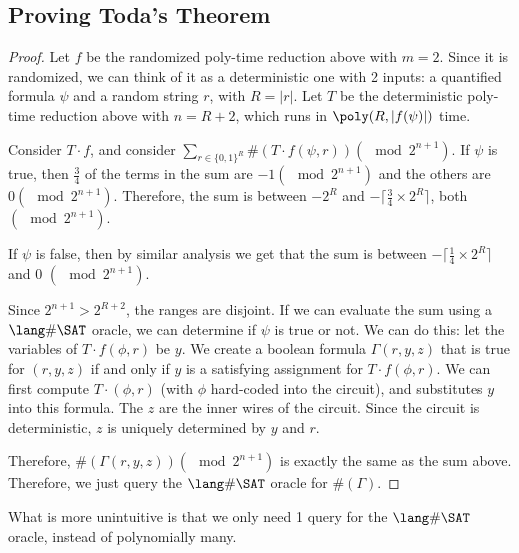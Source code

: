 \subsection{Proving Toda's Theorem}
\begin{proof}
Let $f$ be the randomized poly-time reduction above with $m=2$. Since it is randomized, we can think of it as a deterministic one with 2 inputs: a quantified formula $\psi$ and a random string $r$, with $R = |r|$. Let $T$ be the deterministic poly-time reduction above with $n = R+2$, which runs in $\poly(R, |f(\psi)|)$ time. 

\par Consider $T \cdot f$, and consider $\sum_{r \in \{0, 1\}^R} \#(T \cdot f(\psi, r)) (\mod 2^{n+1})$. If $\psi$ is true, then $\frac{3}{4}$ of the terms in the sum are $-1 (\mod 2^{n+1})$ and the others are $0 (\mod 2^{n+1})$. Therefore, the sum is between $-2^R$ and $-\lceil \frac{3}{4} \times 2^R \rceil$, both $(\mod 2^{n+1})$.

\par If $\psi$ is false, then by similar analysis we get that the sum is between $-\lceil \frac{1}{4} \times 2^R\rceil$ and 0 $(\mod 2^{n+1})$. 

\par Since $2^{n+1} > 2^{R+2}$, the ranges are disjoint. If we can evaluate the sum using a $\SharpSAT$ oracle, we can determine if $\psi$ is true or not. We can do this: let the variables of $T \cdot f(\phi, r)$ be $y$. We create a boolean formula $\Gamma(r, y, z)$ that is true for $(r, y, z)$ if and only if $y$ is a satisfying assignment for $T \cdot f(\phi, r)$. We can first compute $T \cdot(\phi, r)$ (with $\phi$ hard-coded into the circuit), and substitutes $y$ into this formula. The $z$ are the inner wires of the circuit. Since the circuit is deterministic, $z$ is uniquely determined by $y$ and $r$. 

\par Therefore, $\#(\Gamma(r,y,z)) (\mod 2^{n+1})$ is exactly the same as the sum above. Therefore, we just query the $\SharpSAT$ oracle for $\#(\Gamma)$.
\end{proof}
What is more unintuitive is that we only need 1 query for the $\SharpSAT$ oracle, instead of polynomially many. 